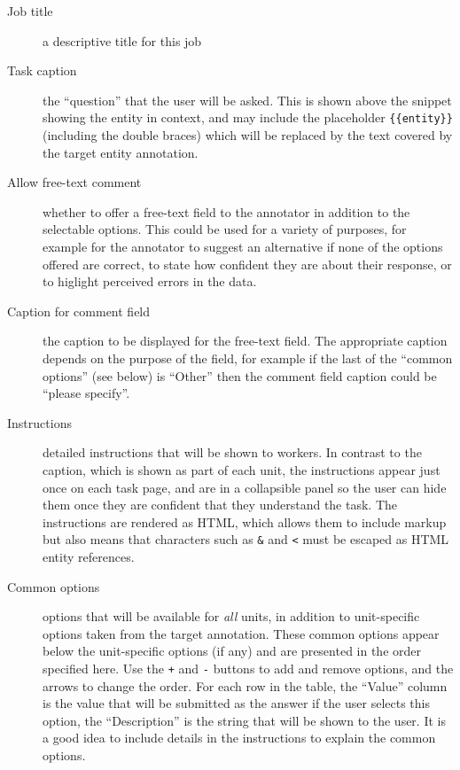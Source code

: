 \begin{description}
\item[Job title] a descriptive title for this job %
\item[Task caption] the ``question'' that the user will be asked.  This is
  shown above the snippet showing the entity in context, and may include the
  placeholder \verb!{{entity}}! (including the double braces) which will be
  replaced by the text covered by the target entity annotation.
\item[Allow free-text comment] whether to offer a free-text field to the
  annotator in addition to the selectable options.  This could be used for a
  variety of purposes, for example for the annotator to suggest an alternative
  if none of the options offered are correct, to state how confident they are
  about their response, or to higlight perceived errors in the data.
\item[Caption for comment field] the caption to be displayed for the free-text
  field.  The appropriate caption depends on the purpose of the field, for
  example if the last of the ``common options'' (see below) is ``Other'' then
  the comment field caption could be ``please specify''.
\item[Instructions] detailed instructions that will be shown to workers.  In
  contrast to the caption, which is shown as part of each unit, the
  instructions appear just once on each task page, and are in a collapsible
  panel so the user can hide them once they are confident that they understand
  the task.  The instructions are rendered as HTML, which allows them to
  include markup but also means that characters such as \verb!&! and \verb!<!
  must be escaped as HTML entity references.
\item[Common options] options that will be available for \emph{all} units, in
  addition to unit-specific options taken from the target annotation.  These
  common options appear below the unit-specific options (if any) and are
  presented in the order specified here.  Use the \verb!+! and \verb|-| buttons
  to add and remove options, and the arrows to change the order.  For each row
  in the table, the ``Value'' column is the value that will be submitted as the
  answer if the user selects this option, the ``Description'' is the string
  that will be shown to the user.  It is a good idea to include details in the
  instructions to explain the common options.
\end{description}

